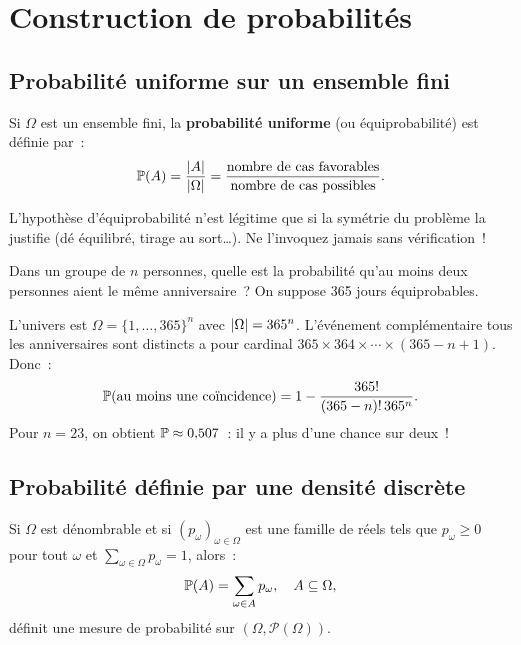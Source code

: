 \section{Construction de probabilit\'es}

\subsection{Probabilit\'e uniforme sur un ensemble fini}

\begin{definition}
Si $\Omega$ est un ensemble fini, la \textbf{probabilit\'e uniforme} (ou
\'equiprobabilit\'e) est d\'efinie par~:
\[
    \PP(A) = \frac{\abs{A}}{\abs{\Omega}} = \frac{\text{nombre de cas favorables}}%
    {\text{nombre de cas possibles}}.
\]
\end{definition}

\begin{intuition}[title=\textbf{Quand utiliser l'\'equiprobabilit\'e ?}]
L'hypoth\`ese d'\'equiprobabilit\'e n'est l\'egitime que si la sym\'etrie du
probl\`eme la justifie (d\'e \'equilibr\'e, tirage au sort\ldots). Ne l'invoquez
jamais sans v\'erification~!
\end{intuition}

\begin{exemple}
Dans un groupe de $n$ personnes, quelle est la probabilit\'e qu'au moins deux
personnes aient le m\^eme anniversaire~? On suppose 365 jours \'equiprobables.

L'univers est $\Omega = \{1, \ldots, 365\}^n$ avec $\left| \Omega \right| = 365^n$.
L'\'ev\'enement compl\'ementaire \og tous les anniversaires sont distincts \fg a
pour cardinal $365 \times 364 \times \cdots \times (365 - n + 1)$. Donc~:
\[
    \mathbb{P}(\text{au moins une co\"incidence})
    = 1 - \frac{365!}{(365-n)!\, 365^n}.
\]
Pour $n = 23$, on obtient $\mathbb{P} \approx 0{,}507$~: il y a plus d'une chance sur deux~!
\end{exemple}

\subsection{Probabilit\'e d\'efinie par une densit\'e discr\`ete}

\begin{proposition}
Si $\Omega$ est d\'enombrable et si $(p_\omega)_{\omega \in \Omega}$ est une famille
de r\'eels tels que $p_\omega \geq 0$ pour tout $\omega$ et
$\sum_{\omega \in \Omega} p_\omega = 1$, alors~:
\[
    \mathbb{P}(A) = \sum_{\omega \in A} p_\omega, \quad A \subseteq \Omega,
\]
d\'efinit une mesure de probabilit\'e sur $(\Omega, \mathcal{P}(\Omega))$.
\end{proposition}


